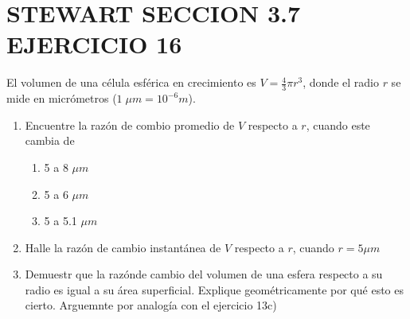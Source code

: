 \chapter*{STEWART SECCION 3.7 EJERCICIO 16}
El volumen de una célula esférica en crecimiento es $V=\frac{4}{3}\pi r^3$, donde el radio $r$ se mide en micrómetros ($1\;\mu m = 10^{-6}m$).
\begin{enumerate}[label=\alph*)]
	\item Encuentre la razón de combio promedio de $V$ respecto a $r$, cuando este cambia de
	      \begin{multicols}{6}
		      \noindent
		      \begin{enumerate}[label=\roman*)]
			      \item 5 a 8 $\mu m$
			            \columnbreak
			      \item 5 a 6 $\mu m$
			            \columnbreak
			      \item 5 a 5.1 $\mu m$
		      \end{enumerate}
	      \end{multicols}
	\item Halle la razón de cambio instantánea de $V$ respecto a $r$, cuando $r=5\mu m$
	\item Demuestr que la razónde cambio del volumen de una esfera respecto a su radio es igual a su área superficial.
	      Explique geométricamente por qué esto es cierto. Arguemnte por analogía con el ejercicio 13c)
\end{enumerate}


